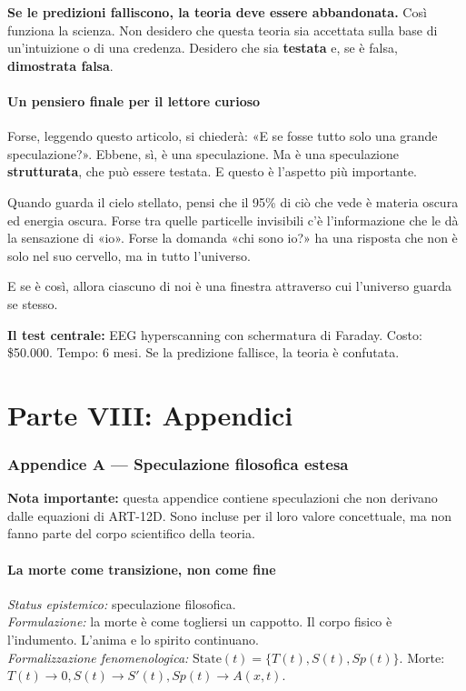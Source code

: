 \textbf{Se le predizioni falliscono, la teoria deve essere abbandonata.} Così funziona la scienza. Non desidero che questa teoria sia accettata sulla base di un'intuizione o di una credenza. Desidero che sia \textbf{testata} e, se è falsa, \textbf{dimostrata falsa}.

\subsection{Un pensiero finale per il lettore curioso}
Forse, leggendo questo articolo, si chiederà: «E se fosse tutto solo una grande speculazione?». Ebbene, sì, è una speculazione. Ma è una speculazione \textbf{strutturata}, che può essere testata. E questo è l'aspetto più importante.

Quando guarda il cielo stellato, pensi che il 95\% di ciò che vede è materia oscura ed energia oscura. Forse tra quelle particelle invisibili c'è l'informazione che le dà la sensazione di «io». Forse la domanda «chi sono io?» ha una risposta che non è solo nel suo cervello, ma in tutto l'universo.

E se è così, allora ciascuno di noi è una finestra attraverso cui l'universo guarda se stesso.

\textbf{Il test centrale:} EEG hyperscanning con schermatura di Faraday. Costo: \$50.000. Tempo: 6 mesi. Se la predizione fallisce, la teoria è confutata.

\newpage
\part*{Parte VIII: Appendici}

\section{Appendice A --- Speculazione filosofica estesa}
\textbf{Nota importante:} questa appendice contiene speculazioni che non derivano dalle equazioni di ART-12D. Sono incluse per il loro valore concettuale, ma non fanno parte del corpo scientifico della teoria.

\subsection{La morte come transizione, non come fine}
\textit{Status epistemico:} speculazione filosofica. \\
\textit{Formulazione:} la morte è come togliersi un cappotto. Il corpo fisico è l'indumento. L'anima e lo spirito continuano. \\
\textit{Formalizzazione fenomenologica:} $\text{State}(t) = \{ T(t), S(t), Sp(t) \}$. Morte: $T(t) \to 0, S(t) \to S'(t), Sp(t) \to A(x,t)$.

